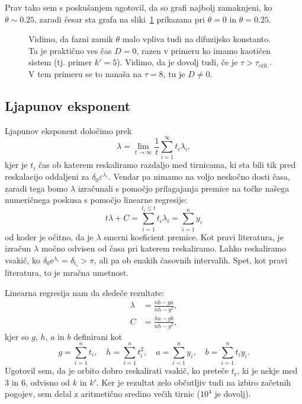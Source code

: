 \documentclass[a4paper, 12pt]{article}
\newcommand{\e}{
	\ensuremath{\varepsilon}
}
\begin{document}
Prav tako sem s posku\v sanjem ugotovil, da so grafi najbolj zamaknjeni, ko $\theta \sim 0.25$, zaradi \v cesar
sta grafa na sliki~\ref{difuzija} prikazana pri $\theta = 0$ in $\theta = 0.25$.

\begin{figure}[H]\centering
	
	\caption{Vidimo, da fazni zamik $\theta$ malo vpliva tudi na difuzijsko konstanto. Ta je prakti\v cno ves \v cas
	$D = 0$, razen v primeru ko imamo kaoti\v cen sistem (tj. primer $k' = 5$). Vidimo, da je dovolj tudi, \v ce je
	$\tau > \tau_\text{crit.}$. V tem primeru se to nana\v sa na $\tau = 8$, tu je $D \neq 0$.}
	\label{difuzija}
\end{figure}

\subsection{Ljapunov eksponent}

Ljapunov eksponent dolo\v cimo prek
\begin{equation}
	\lambda = \lim_{t \to \infty} \frac{1}{t} \sum_{i = 1}^\infty t_i \lambda_i,
\end{equation}
kjer je $t_i$ \v cas ob katerem reskaliramo razdaljo med tirnicama, ki sta bili tik pred reskalacijo oddaljeni za
$\delta_0 \e^{\lambda_i}$. Vendar pa nimamo na voljo nesko\v cno dosti \v casa, zaradi tega bomo $\lambda$ izra\v cunali
s pomo\v cjo prilagajanja premice na to\v cke na\v sega numeri\v cnega poskusa s pomo\v cjo linearne regresije:
\begin{equation}
	t\lambda + C = \sum_{i = 1}^{t_i \leq t} t_i \lambda_i = \sum_{i = 1}^n y_i
\end{equation}
od koder je o\v citno, da je $\lambda$ smerni koeficient premice. Kot pravi literatura, je izra\v cun $\lambda$ mo\v cno
odvisen od \v casa pri katerem reskaliramo. Lahko reskaliramo vsaki\v c, ko $\delta_0 \mathrm{e}^{\lambda_i} = \delta_{t_i}
> \pi$, ali pa ob enakih \v casovnih intervalih. Spet, kot pravi literatura, to je mra\v cna umetnost.

Linearna regresija nam da slede\v ce rezultate:
\begin{align}
	\lambda &= \frac{nb - ga}{nh - g^2}, \\
	C &= \frac{ha - gb}{nh - g^2},
\end{align}
kjer so $g$, $h$, $a$ in $b$ definirani kot
\begin{equation}
	g = \sum_{i = 1}^n t_i,\quad h = \sum_{i = 1}^n t_i^2,\quad a = \sum_{i = 1}^n y_i,
	\quad b = \sum_{i = 1}^n t_i y_i.
\end{equation}
Ugotovil sem, da je orbito dobro reskalirati vsaki\v c, ko prete\v ce $t_\mathrm{r}$, ki je nekje med $3$ in $6$, odvisno
od $k$ in $k'$. Ker je rezultat zelo ob\v cutljiv tudi na izbiro za\v cetnih pogojev, sem delal z aritmeti\v cno sredino
ve\v cih tirnic ($10^4$ je dovolj).
\end{document}
